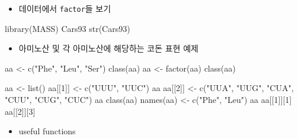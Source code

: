 \documentclass[
]{book}
\newenvironment{Shaded}{\begin{snugshade}}{\end{snugshade}}
\newcommand{\DecValTok}[1]{\textcolor[rgb]{0.00,0.00,0.81}{#1}}
\newcommand{\FunctionTok}[1]{\textcolor[rgb]{0.00,0.00,0.00}{#1}}
\newcommand{\NormalTok}[1]{#1}
\newcommand{\OtherTok}[1]{\textcolor[rgb]{0.56,0.35,0.01}{#1}}
\newcommand{\StringTok}[1]{\textcolor[rgb]{0.31,0.60,0.02}{#1}}
\providecommand{\tightlist}{%
  \setlength{\itemsep}{0pt}\setlength{\parskip}{0pt}}
\begin{document}
\begin{itemize}
\tightlist
\item
  데이터에서 \texttt{factor}들 보기
\end{itemize}

\begin{Shaded}
\begin{Highlighting}[]
\FunctionTok{library}\NormalTok{(MASS)}
\NormalTok{Cars93}
\FunctionTok{str}\NormalTok{(Cars93)}
\end{Highlighting}
\end{Shaded}

\begin{itemize}
\tightlist
\item
  아미노산 및 각 아미노산에 해당하는 코돈 표현 예제
\end{itemize}

\begin{Shaded}
\begin{Highlighting}[]

\NormalTok{aa }\OtherTok{\textless{}{-}} \FunctionTok{c}\NormalTok{(}\StringTok{"Phe"}\NormalTok{, }\StringTok{"Leu"}\NormalTok{, }\StringTok{"Ser"}\NormalTok{)}
\FunctionTok{class}\NormalTok{(aa)}
\NormalTok{aa }\OtherTok{\textless{}{-}} \FunctionTok{factor}\NormalTok{(aa)}
\FunctionTok{class}\NormalTok{(aa)}

\NormalTok{aa }\OtherTok{\textless{}{-}} \FunctionTok{list}\NormalTok{()}
\NormalTok{aa[[}\DecValTok{1}\NormalTok{]] }\OtherTok{\textless{}{-}} \FunctionTok{c}\NormalTok{(}\StringTok{"UUU"}\NormalTok{, }\StringTok{"UUC"}\NormalTok{)}
\NormalTok{aa}
\NormalTok{aa[[}\DecValTok{2}\NormalTok{]] }\OtherTok{\textless{}{-}} \FunctionTok{c}\NormalTok{(}\StringTok{"UUA"}\NormalTok{, }\StringTok{"UUG"}\NormalTok{, }\StringTok{"CUA"}\NormalTok{, }\StringTok{"CUU"}\NormalTok{, }\StringTok{"CUG"}\NormalTok{, }\StringTok{"CUC"}\NormalTok{)}
\NormalTok{aa}
\FunctionTok{class}\NormalTok{(aa)}
\FunctionTok{names}\NormalTok{(aa) }\OtherTok{\textless{}{-}} \FunctionTok{c}\NormalTok{(}\StringTok{"Phe"}\NormalTok{, }\StringTok{"Leu"}\NormalTok{)}
\NormalTok{aa}
\NormalTok{aa[[}\DecValTok{1}\NormalTok{]][}\DecValTok{1}\NormalTok{]}
\NormalTok{aa[[}\DecValTok{2}\NormalTok{]][}\DecValTok{3}\NormalTok{]}
\end{Highlighting}
\end{Shaded}

\begin{itemize}
\tightlist
\item
  useful functions
\end{itemize}
\end{document}
